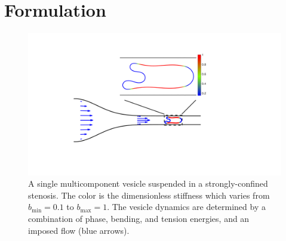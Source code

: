 \documentclass[twoside,twocolumn,9pt]{article}
\begin{document}
\section{\label{sec:Formulation}Formulation}
\begin{figure}[H]
  \centering
  \includegraphics[width=0.9\columnwidth]{figures/schematic.pdf}
  \caption{\label{fig:schematic}\small A single multicomponent vesicle
  suspended in a strongly-confined stenosis. The color is the
  dimensionless stiffness which varies from $b_{\min} = 0.1$ to
  $b_{\max} = 1$. The vesicle dynamics are determined by a combination
  of phase, bending, and tension energies, and an imposed flow (blue
  arrows).}
\end{figure}
\end{document}
